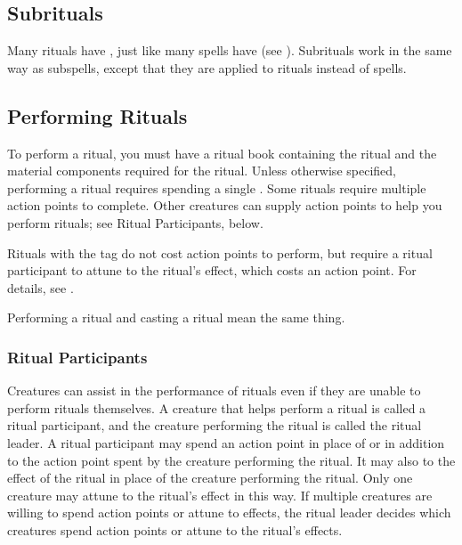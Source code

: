     \subsection{Subrituals}\label{Subrituals}
        Many rituals have , just like many spells have  (see ).
        Subrituals work in the same way as subspells, except that they are applied to rituals instead of spells.

    \subsection{Performing Rituals}
        To perform a ritual, you must have a ritual book containing the ritual and the material components required for the ritual.
        Unless otherwise specified, performing a ritual requires spending a single .
        Some rituals require multiple action points to complete.
        Other creatures can supply action points to help you perform rituals; see Ritual Participants, below.


        Rituals with the  tag do not cost action points to perform, but require a ritual participant to attune to the ritual's effect, which costs an action point.
        For details, see .

        Performing a ritual and casting a ritual mean the same thing.

        \subsubsection{Ritual Participants}
            Creatures can assist in the performance of rituals even if they are unable to perform rituals themselves.
            A creature that helps perform a ritual is called a ritual participant, and the creature performing the ritual is called the ritual leader.
            A ritual participant may spend an action point in place of or in addition to the action point spent by the creature performing the ritual.
            It may also  to the effect of the ritual in place of the creature performing the ritual.
            Only one creature may attune to the ritual's effect in this way.
            If multiple creatures are willing to spend action points or attune to effects, the ritual leader decides which creatures spend action points or attune to the ritual's effects.

